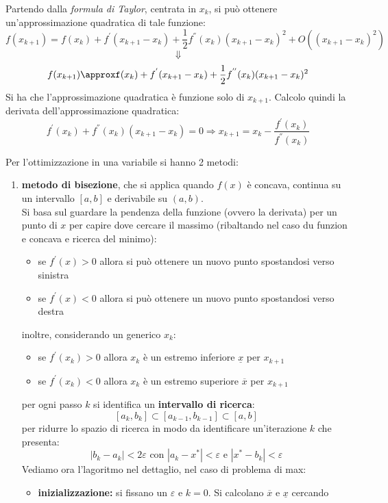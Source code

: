 \documentclass[a4paper,12pt, oneside]{book}
\begin{document}
\begin{shaded}
  Partendo dalla \textit{formula di Taylor}, centrata in $x_k$, si può
  ottenere un'approssimazione quadratica di tale funzione:
  \[f(x_{k+1})=f(x_k)+f^{'}(x_{k+1}-x_k)+\frac{1}{2}f^{''}(x_k)(x_{k+1}-x_k)^2
    +O((x_{k+1} -x_k)^2)\]
  \[\Downarrow\]
  \[f(x_{k+1})\approxf(x_k)+f^{'}(x_{k+1}-x_k)+\frac{1}{2}f^{''}(x_k)(x_{k+1}-x_k)^2\]
  Si ha che l'approssimazione quadratica è funzione solo di
  $x_{k+1}$. Calcolo quindi la derivata dell'approssimazione
  quadratica:
  \[f^{'}(x_k)+f^{''}(x_k)(x_{k+1}-x_k)=0\Longrightarrow
    x_{k+1}=x_k-\frac{f^{'}(x_k)}{f^{''}(x_k)}\]
\end{shaded}
Per l'ottimizzazione in una variabile si hanno 2 metodi:
\begin{enumerate}
  \item \textbf{metodo di bisezione}, che si applica quando $f(x)$ è
  concava, continua su un intervallo $[a,b]$ e derivabile su
  $(a,b)$.\\
  Si basa sul guardare la pendenza della funzione (ovvero la derivata)
  per un punto di $x$ per capire dove cercare il massimo (ribaltando
  nel caso du funzion e concava e ricerca del minimo):
  \begin{itemize}
    \item se $f^{'}(x)>0$ allora si può ottenere un nuovo punto
    spostandosi verso sinistra
    \item se $f^{'}(x)<0$ allora si può ottenere un nuovo punto
    spostandosi verso destra
  \end{itemize}
  inoltre, considerando un generico $x_k$:
   \begin{itemize}
    \item se $f^{'}(x_k)>0$ allora $x_k$ è un estremo inferiore
    $\underline{x}$ per $x_{k+1}$ 
    \item se $f^{'}(x_k)<0$ allora $x_k$ è un estremo superiore
    $\overline{x}$ per $x_{k+1}$ 
  \end{itemize}
  per ogni passo $k$ si identifica un \textbf{intervallo di ricerca}:
  \[[a_k,b_k]\subset[a_{k-1},b_{k-1}]\subset[a,b]\]
  per ridurre lo spazio di ricerca in modo da identificare
  un'iterazione $k$ che presenta:
  \[|b_k-a_k|<2\varepsilon\mbox{ con }|a_k-x^*|<\varepsilon \mbox{ e
    }|x^*-b_k|<\varepsilon\] 
  Vediamo ora l'lagoritmo nel dettaglio, nel caso di problema di max:
  \begin{itemize}
    \item \textbf{inizializzazione: }si fissano un $\varepsilon$ e
    $k=0$. Si calcolano $\overline{x}$ e $\underline{x}$ cercando

\end{itemize}
\end{enumerate}
\end{document}
